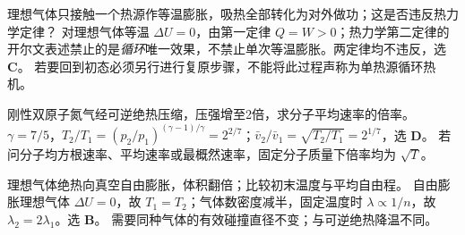 \problemtext 理想气体只接触一个热源作等温膨胀，吸热全部转化为对外做功；这是否违反热力学定律？
\workings 对理想气体等温 $\Delta U=0$，由第一定律 $Q=W>0$；热力学第二定律的开尔文表述禁止的是\emph{循环}唯一效果，不禁止单次等温膨胀。两定律均不违反，选 \textbf{C}。
\crosscheck 若要回到初态必须另行进行复原步骤，不能将此过程声称为单热源循环热机。

\problemtext 刚性双原子氮气经可逆绝热压缩，压强增至2倍，求分子平均速率的倍率。
\workings $\gamma=7/5$，$T_2/T_1=(p_2/p_1)^{(\gamma-1)/\gamma}=2^{2/7}$；$\bar v_2/\bar v_1=\sqrt{T_2/T_1}=\boxed{2^{1/7}}$，选 \textbf{D}。
\crosscheck 若问分子均方根速率、平均速率或最概然速率，固定分子质量下倍率均为 $\sqrt T$。

\problemtext 理想气体绝热向真空自由膨胀，体积翻倍；比较初末温度与平均自由程。
\workings 自由膨胀理想气体 $\Delta U=0$，故 $T_1=T_2$；气体数密度减半，固定温度时 $\lambda\propto1/n$，故 $\lambda_2=2\lambda_1$。选 \textbf{B}。
\crosscheck 需要同种气体的有效碰撞直径不变；与可逆绝热降温不同。
